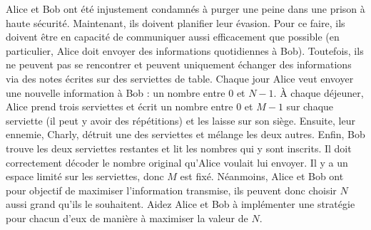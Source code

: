 \documentclass[12pt]{article}
\begin{document}
\renewcommand{\round}{Jour 1}
\renewcommand{\problemName}{Problème Prison}
\renewcommand{\lang}{Français}

\renewcommand{\tl}{$2$ sec.}
\renewcommand{\ml}{$1024$ Mo}
\problem{\problemName}

Alice et Bob ont été injustement condamnés à purger une peine dans une prison à haute sécurité. Maintenant, ils doivent planifier leur évasion. Pour ce faire, ils doivent être en capacité de communiquer aussi efficacement que possible (en particulier, Alice doit envoyer des informations quotidiennes à Bob). Toutefois, ils ne peuvent pas se rencontrer et peuvent uniquement échanger des informations via des notes écrites sur des serviettes de table. Chaque jour Alice veut envoyer une nouvelle information à Bob : un nombre entre $0$ et $N-1$. À chaque déjeuner, Alice prend trois serviettes et écrit un nombre entre $0$ et $M-1$ sur chaque serviette (il peut y avoir des répétitions) et les laisse sur son siège. Ensuite, leur ennemie, Charly, détruit une des serviettes et mélange les deux autres. Enfin, Bob trouve les deux serviettes restantes et lit les nombres qui y sont inscrits. Il doit correctement décoder le nombre original qu'Alice voulait lui envoyer. Il y a un espace limité sur les serviettes, donc $M$ est fixé. Néanmoins, Alice et Bob ont pour objectif de maximiser l'information transmise, ils peuvent donc choisir $N$ aussi grand qu'ils le souhaitent. Aidez Alice et Bob à implémenter une stratégie pour chacun d'eux de manière à maximiser la valeur de $N$.
\end{document}
